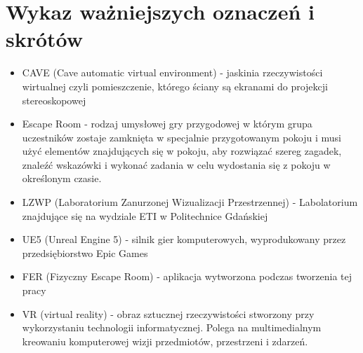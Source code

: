 \chapter*{Wykaz ważniejszych oznaczeń i skrótów}

\begin{itemize}
    \item CAVE (Cave automatic virtual environment) - jaskinia  rzeczywistości wirtualnej czyli pomieszczenie, którego ściany są ekranami do projekcji stereoskopowej

\item
Escape Room - rodzaj umysłowej gry przygodowej w którym grupa uczestników zostaje zamknięta w specjalnie          przygotowanym pokoju i musi użyć elementów znajdujących się w pokoju, aby rozwiązać szereg zagadek, znaleźć wskazówki i wykonać zadania w celu wydostania się z pokoju w określonym czasie.

\item
LZWP (Laboratorium Zanurzonej Wizualizacji Przestrzennej) - Labolatorium znajdujące się na wydziale ETI w Politechnice Gdańskiej

\item
UE5 (Unreal Engine 5) - silnik gier komputerowych, wyprodukowany przez przedsiębiorstwo Epic Games
\item
FER (Fizyczny Escape Room) - aplikacja wytworzona podczas tworzenia tej pracy 
\item VR (virtual reality) - obraz sztucznej rzeczywistości stworzony przy wykorzystaniu technologii informatycznej. Polega na multimedialnym kreowaniu komputerowej wizji przedmiotów, przestrzeni i zdarzeń. 

\end{itemize}